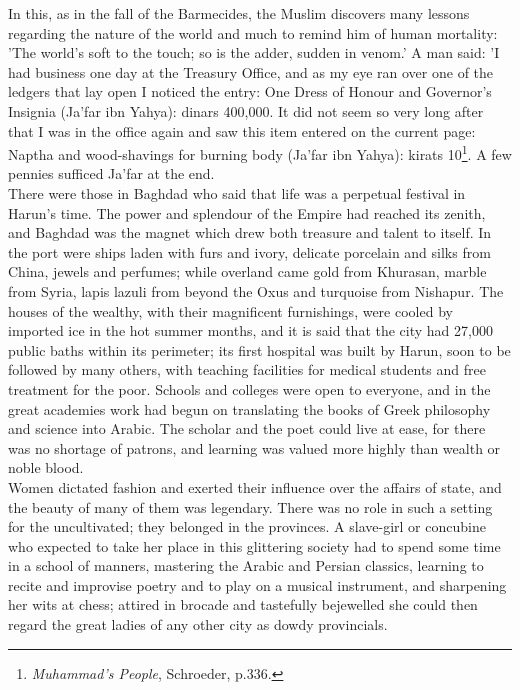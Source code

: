 \documentclass[11pt, b5paper, twoside]{book}
\begin{document}
In this, as in the fall of the Barmecides, the Muslim discovers many lessons regarding the nature of 
the world and much to remind him of human mortality: 'The world's soft to the touch; so is the adder, 
sudden in venom.' A man said: 'I had business one day at the Treasury Office, and as my eye ran over 
one of the ledgers that lay open I noticed the entry: One Dress of Honour and Governor's Insignia 
(Ja'far ibn Yahya): dinars 400,000. It did not seem so very long after that I was in the office again 
and saw this item entered on the current page: Naptha and wood-shavings for burning body (Ja'far ibn 
Yahya): kirats 10\footnote{\emph{Muhammad's People}, Schroeder, p.336.}. A few pennies sufficed Ja'far at the end. \\

There were those in Baghdad who said that life was a perpetual festival in Harun's time. The power 
and splendour of the Empire had reached its zenith, and Baghdad was the magnet which drew both 
treasure and talent to itself. In the port were ships laden with furs and ivory, delicate porcelain 
and silks from China, jewels and perfumes; while overland came gold from Khurasan, marble from Syria, 
lapis lazuli from beyond the Oxus and turquoise from Nishapur. The houses of the wealthy, with their 
magnificent furnishings, were cooled by imported ice in the hot summer months, and it is said that 
the city had 27,000 public baths within its perimeter; its first hospital was built by Harun, soon to 
be followed by many others, with teaching facilities for medical students and free treatment for the 
poor. Schools and colleges were open to everyone, and in the great academies work had begun on 
translating the books of Greek philosophy and science into Arabic. The scholar and the poet could 
live at ease, for there was no shortage of patrons, and learning was valued more highly than wealth 
or noble blood. \\

Women dictated fashion and exerted their influence over the affairs of state, and the beauty of many 
of them was legendary. There was no role in such a setting for the uncultivated; they belonged in the 
provinces. A slave-girl or concubine who expected to take her place in this glittering society had to 
spend some time in a school of manners, mastering the Arabic and Persian classics, learning to recite 
and improvise poetry and to play on a musical instrument, and sharpening her wits at chess; attired 
in brocade and tastefully bejewelled she could then regard the great ladies of any other city as 
dowdy provincials. \\
\end{document}
